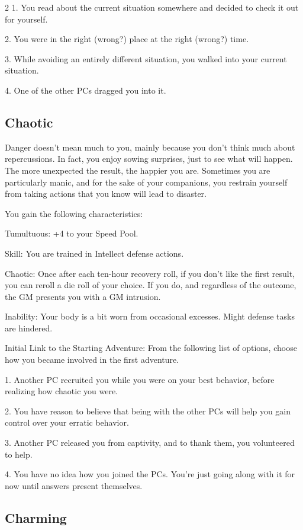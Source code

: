 \begin{multicols}{2}
1. You read about the current situation somewhere and decided to check it out for yourself.

2. You were in the right (wrong?) place at the right (wrong?) time.

3. While avoiding an entirely different situation, you walked into your current situation.

4. One of the other PCs dragged you into it.

\subsection{Chaotic}

Danger doesn’t mean much to you, mainly because you don’t think much about repercussions. In fact, you enjoy sowing surprises, just to see what will happen. The more unexpected the result, the happier you are. Sometimes you are particularly manic, and for the sake of your companions, you restrain yourself from taking actions that you know will lead to disaster.

You gain the following characteristics: 

Tumultuous: +4 to your Speed Pool. 

Skill: You are trained in Intellect defense actions.

Chaotic: Once after each ten-hour recovery roll, if you don’t like the first result, you can reroll a die roll of your choice. If you do, and regardless of the outcome, the GM presents you with a GM intrusion.

Inability: Your body is a bit worn from occasional excesses. Might defense tasks are hindered.

Initial Link to the Starting Adventure: From the following list of options, choose how you became involved in the first adventure.

1. Another PC recruited you while you were on your best behavior, before realizing how chaotic you were.

2. You have reason to believe that being with the other PCs will help you gain control over your erratic behavior.

3. Another PC released you from captivity, and to thank them, you volunteered to help.

4. You have no idea how you joined the PCs. You’re just going along with it for now until answers present themselves.

\subsection{Charming}


\end{multicols}

